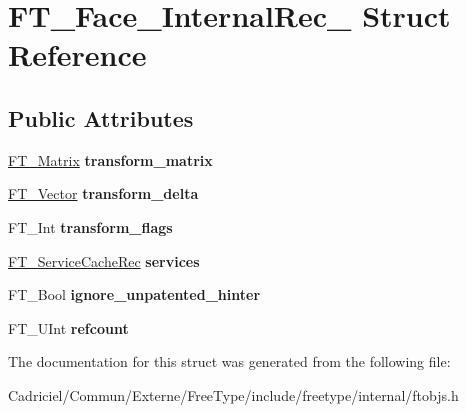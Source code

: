 \hypertarget{struct_f_t___face___internal_rec__}{}\section{F\+T\+\_\+\+Face\+\_\+\+Internal\+Rec\+\_\+ Struct Reference}
\label{struct_f_t___face___internal_rec__}
\subsection*{Public Attributes}
\begin{DoxyCompactItemize}
\item 
\hyperlink{struct_f_t___matrix__}{F\+T\+\_\+\+Matrix} {\bfseries transform\+\_\+matrix}\hypertarget{struct_f_t___face___internal_rec___ab4be2dcda098e6136f5701580d18032d}{}\label{struct_f_t___face___internal_rec___ab4be2dcda098e6136f5701580d18032d}

\item 
\hyperlink{struct_f_t___vector__}{F\+T\+\_\+\+Vector} {\bfseries transform\+\_\+delta}\hypertarget{struct_f_t___face___internal_rec___ab6c2aacdac58312273395b21b8d168c6}{}\label{struct_f_t___face___internal_rec___ab6c2aacdac58312273395b21b8d168c6}

\item 
F\+T\+\_\+\+Int {\bfseries transform\+\_\+flags}\hypertarget{struct_f_t___face___internal_rec___a2495aced35040e1b7c2bc0afcd7a920d}{}\label{struct_f_t___face___internal_rec___a2495aced35040e1b7c2bc0afcd7a920d}

\item 
\hyperlink{struct_f_t___service_cache_rec__}{F\+T\+\_\+\+Service\+Cache\+Rec} {\bfseries services}\hypertarget{struct_f_t___face___internal_rec___abc3acb3bf5db056bb9c549af04f07963}{}\label{struct_f_t___face___internal_rec___abc3acb3bf5db056bb9c549af04f07963}

\item 
F\+T\+\_\+\+Bool {\bfseries ignore\+\_\+unpatented\+\_\+hinter}\hypertarget{struct_f_t___face___internal_rec___af898fd754c36c3f34c9ce0e88eb101c9}{}\label{struct_f_t___face___internal_rec___af898fd754c36c3f34c9ce0e88eb101c9}

\item 
F\+T\+\_\+\+U\+Int {\bfseries refcount}\hypertarget{struct_f_t___face___internal_rec___a05d49c857c024a50441e17899803f56c}{}\label{struct_f_t___face___internal_rec___a05d49c857c024a50441e17899803f56c}

\end{DoxyCompactItemize}


The documentation for this struct was generated from the following file\+:\begin{DoxyCompactItemize}
\item 
Cadriciel/\+Commun/\+Externe/\+Free\+Type/include/freetype/internal/ftobjs.\+h\end{DoxyCompactItemize}
